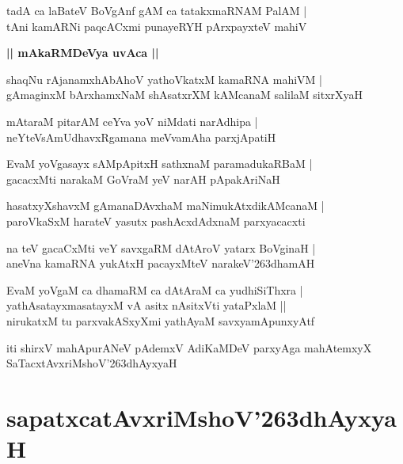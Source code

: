\documentclass[twoside,12pt,openright]{book}
\def\S{\char'263}
\newcounter{shloka}[chapter]
\def\uvaca#1{\centerline{{\large\textbf{#1}}}}
\begin{document}
\begin{shloka}
tadA ca laBateV BoVgAnf gAM ca tatakxmaRNAM PalAM |\\
tAni kamARNi paqcACxmi punayeRYH pArxpayxteV mahiV 
\end{shloka}

\uvaca{|| mAkaRMDeVya uvAca ||}

\begin{shloka}
shaqNu rAjanamxhAbAhoV yathoVkatxM kamaRNA mahiVM |\\
gAmaginxM bArxhamxNaM shAsatxrXM  kAMcanaM salilaM sitxrXyaH 
\end{shloka}

\begin{shloka}
mAtaraM pitarAM ceYva yoV niMdati narAdhipa |\\
neYteVsAmUdhavxRgamana meVvamAha parxjApatiH 
\end{shloka}

\begin{shloka}
EvaM yoVgasayx sAMpApitxH sathxnaM paramadukaRBaM |\\
gacacxMti narakaM GoVraM yeV narAH pApakAriNaH 
\end{shloka}

\begin{shloka}
hasatxyXshavxM gAmanaDAvxhaM maNimukAtxdikAMcanaM |\\
paroVkaSxM harateV yasutx pashAcxdAdxnaM parxyacacxti 
\end{shloka}

\begin{shloka}
na teV gacaCxMti veY savxgaRM dAtAroV yatarx BoVginaH |\\
aneVna kamaRNA yukAtxH pacayxMteV narakeV\S dhamAH 
\end{shloka}

\begin{shloka}
EvaM yoVgaM ca dhamaRM ca dAtAraM ca yudhiSiThxra |\\
yathAsatayxmasatayxM vA asitx nAsitxVti yataPxlaM ||\\
nirukatxM tu parxvakASxyXmi yathAyaM savxyamApunxyAtf
\end{shloka}

\begin{center}
iti shirxV mahApurANeV pAdemxV AdiKaMDeV parxyAga mahAtemxyX SaTacxtAvxriMshoV\S dhAyxyaH 
\end{center}

\chapter{sapatxcatAvxriMshoV\S dhAyxyaH}
\end{document}
